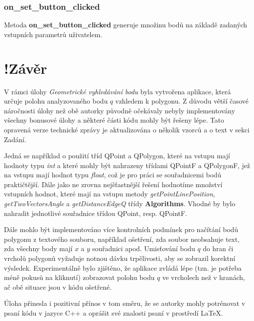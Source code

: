 \documentclass[a4paper, 12pt]{article}
\begin{document}
\subsubsection{on\_set\_button\_clicked}
Metoda \textbf{on\_set\_button\_clicked} generuje množinu bodů na základě zadaných vstupních parametrů uživatelem.

\clearpage
\section{!Závěr}
V rámci úlohy \textit{Geometrické vyhledávání bodu} byla vytvořena aplikace, která určuje polohu analyzovaného bodu $q$ vzhledem k polygonu. Z důvodu větší časové náročnosti úlohy než obě autorky původně očekávaly nebyly implementovány všechny bonusové úlohy a některé části kódu mohly být řešeny lépe. Tato opravená verze technické zprávy je aktualizována o několik vzorců a o text v sekci Zadání. 

Jedná se například o použití tříd QPoint a QPolygon, které na vstupu mají hodnoty typu \textit{int} a které mohly být nahrazeny třídami QPointF a QPolygonF, jež na vstupu mají hodnot typu \textit{float}, což je pro práci se souřadnicemi bodů praktičtější. Dále jako ne zrovna nejšťastnější řešení hodnotíme množství vstupních hodnot, které mají na vstupu metody \textit{getPointLinePosition}, \textit{getTwoVectorsAngle} a \textit{getDistanceEdgeQ} třídy \textbf{Algorithms}. Vhodné by bylo nahradit jednotlivé souřadnice třídou QPoint, resp. QPointF. 

Dále mohlo být implementováno více kontrolních podmínek pro načítání bodů polygonu z textového souboru, například ošetření, zda soubor neobsahuje text, zda všechny body mají $x$ a $y$ souřadnici apod. Umisťování bodu $q$ do hran či vrcholů polygonů vyžaduje notnou dávku trpělivosti, aby se zobrazil korektní výsledek. Experimentálně bylo zjištěno, že aplikace zvládá lépe (tzn. je potřeba méně pokusů na kliknutí) zobrazovat polohu bodu $q$ ve vrcholech než v hranách, ač obě situace jsou v kódu ošetřené. 

Úloha přinesla i pozitivní přínos v tom směru, že se autorky mohly potrénovat v psaní kódu v jazyce C++ a oprášit své znalosti psaní v prostředí LaTeX.

\clearpage
\end{document}
